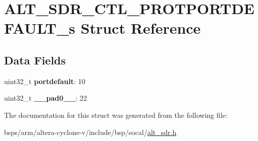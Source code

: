 \hypertarget{structALT__SDR__CTL__PROTPORTDEFAULT__s}{}\section{A\+L\+T\+\_\+\+S\+D\+R\+\_\+\+C\+T\+L\+\_\+\+P\+R\+O\+T\+P\+O\+R\+T\+D\+E\+F\+A\+U\+L\+T\+\_\+s Struct Reference}
\label{structALT__SDR__CTL__PROTPORTDEFAULT__s}
\subsection*{Data Fields}
\begin{DoxyCompactItemize}
\item 
\mbox{\label{structALT__SDR__CTL__PROTPORTDEFAULT__s_abae1922cb33bea78e39292bb71b576bf}} 
uint32\+\_\+t {\bfseries portdefault}\+: 10
\item 
\mbox{\label{structALT__SDR__CTL__PROTPORTDEFAULT__s_a75f9272b498561fb5f6fb1da2b6be683}} 
uint32\+\_\+t {\bfseries \+\_\+\+\_\+pad0\+\_\+\+\_\+}\+: 22
\end{DoxyCompactItemize}


The documentation for this struct was generated from the following file\+:\begin{DoxyCompactItemize}
\item 
bsps/arm/altera-\/cyclone-\/v/include/bsp/socal/\mbox{\hyperlink{alt__sdr_8h}{alt\+\_\+sdr.\+h}}\end{DoxyCompactItemize}
